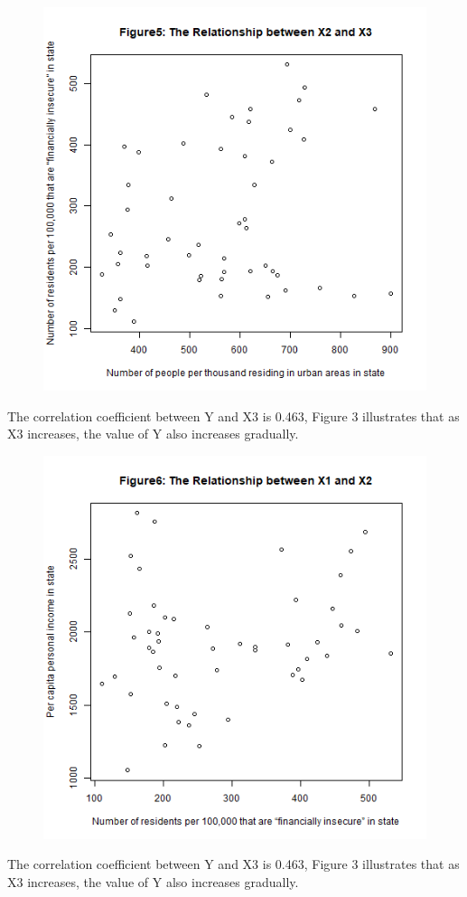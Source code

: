 \documentclass[12pt,letterpaper]{article}
\begin{document}
\begin{itemize}
\begin{figure}[H]
	\centering
	\includegraphics[width=.55\textwidth]{X2~X3.png}
\end{figure}
\noindent The correlation coefficient between Y and X3 is 0.463, Figure 3 illustrates that as X3 increases, the value of Y also increases gradually. \\

\begin{figure}[H]
	\centering
	\includegraphics[width=.55\textwidth]{X1~X2.png}
\end{figure}
\noindent The correlation coefficient between Y and X3 is 0.463, Figure 3 illustrates that as X3 increases, the value of Y also increases gradually. \\


\end{itemize}
\end{document}
